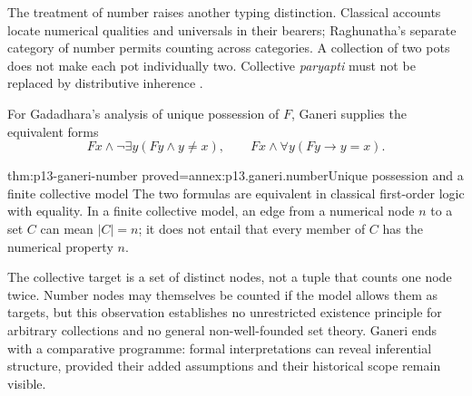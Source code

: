 The treatment of number raises another typing distinction. Classical
accounts locate numerical qualities and universals in their bearers;
Raghunatha's separate category of number permits counting across
categories. A collection of two pots does not make each pot individually
two. Collective \emph{paryapti} must not be replaced by distributive
inherence \cite[pp.~387--391]{Ganeri2004IndianLogicPublished}.

For Gadadhara's analysis of unique possession of \(F\), Ganeri supplies the
equivalent forms
\[
 Fx\land\neg\exists y(Fy\land y\ne x),\qquad
 Fx\land\forall y(Fy\to y=x).
\]
\begin{hblemma}{thm:p13-ganeri-number}
 {proved=annex:p13.ganeri.number}{Unique possession and a finite collective model}
The two formulas are equivalent in classical first-order logic with equality.
In a finite collective model, an edge from a numerical node \(n\) to a set
\(C\) can mean \(|C|=n\); it does not entail that every member of \(C\)
has the numerical property \(n\).
\end{hblemma}

The collective target is a set of distinct nodes, not a tuple that counts
one node twice. Number nodes may themselves be counted if the model allows
them as targets, but this observation establishes no unrestricted existence
principle for arbitrary collections and no general non-well-founded
set theory. Ganeri ends with a comparative programme: formal interpretations
can reveal inferential structure, provided their added assumptions and
their historical scope remain visible.
